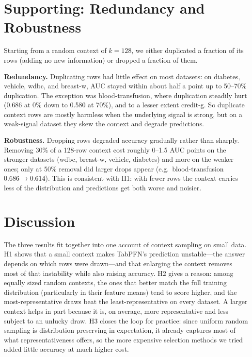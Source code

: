 \documentclass[11pt,a4paper]{article}
\begin{document}
\section{Supporting: Redundancy and Robustness}

Starting from a random context of $k{=}128$, we either duplicated a fraction of
its rows (adding no new information) or dropped a fraction of them.

\textbf{Redundancy.} Duplicating rows had little effect on most datasets: on
diabetes, vehicle, wdbc, and breast-w, AUC stayed within about half a point up
to 50--70\% duplication. The exception was blood-transfusion, where duplication
steadily hurt (0.686 at 0\% down to 0.580 at 70\%), and to a lesser extent
credit-g. So duplicate context rows are mostly harmless when the underlying
signal is strong, but on a weak-signal dataset they skew the context and degrade
predictions.

\textbf{Robustness.} Dropping rows degraded accuracy gradually rather than
sharply. Removing 30\% of a 128-row context cost roughly 0--1.5 AUC points on the
stronger datasets (wdbc, breast-w, vehicle, diabetes) and more on the weaker
ones; only at 50\% removal did larger drops appear (e.g.\ blood-transfusion
$0.686\rightarrow0.614$). This is consistent with H1: with fewer rows the context
carries less of the distribution and predictions get both worse and noisier.

\section{Discussion}

The three results fit together into one account of context sampling on small
data. H1 shows that a small context makes TabPFN's prediction unstable---the
answer depends on which rows were drawn---and that enlarging the context removes
most of that instability while also raising accuracy. H2 gives a reason: among
equally sized random contexts, the ones that better match the full training
distribution (particularly in their feature means) tend to score higher, and the
most-representative draws beat the least-representative on every dataset. A
larger context helps in part because it is, on average, more representative and
less subject to an unlucky draw. H3 closes the loop for practice: since uniform
random sampling is distribution-preserving in expectation, it already captures
most of what representativeness offers, so the more expensive selection methods
we tried added little accuracy at much higher cost.
\end{document}
